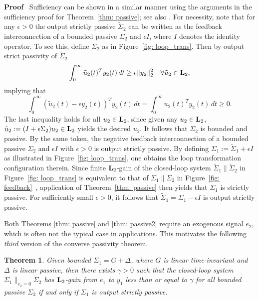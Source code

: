 \documentclass[11pt]{article}
\newtheorem{thm}[lemma]{Theorem}
\newcommand{\Ltwo}{\boldsymbol{\rm L}_{2}}
\begin{document}
\noindent
{\bf Proof} \,
  Sufficiency can be shown in a similar manner using the arguments in the sufficiency proof for Theorem~\ref{thm:
    passive}; see also \cite{Sch17}. For necessity, note that for any $\epsilon > 0$ the output strictly passive $\widetilde{\Sigma}_2$ can be written as the feedback interconnection of a bounded passive $\Sigma_2$ and $\epsilon I$, where $I$ denotes the identity operator. To see this, define $\Sigma_2$ as in Figure~\ref{fig: loop_trans}. Then by output strict passivity of $\widetilde{\Sigma}_2$
\[
\int_0^\infty \tilde{u}_2(t)^T y_2(t) \, dt \geq \epsilon \|y_2\|_2^2 \quad \forall \tilde{u}_2 \in \Ltwo,
\]
implying that
\[
\int_0^\infty (\tilde{u}_2(t) - \epsilon y_2(t))^T y_2(t) \, dt = \int_0^\infty u_2(t)^T y_2(t) \, dt \geq 0.
\]
The last inequality holds for all $u_2 \in \Ltwo$, since given any $u_2 \in \Ltwo$, $\tilde{u}_2 := (I + \epsilon \Sigma_2)u_2 \in \Ltwo$ yields the
desired $u_2$. It follows that $\Sigma_2$ is bounded and passive. By the same token, the negative feedback interconnection of a bounded passive
$\Sigma_2$ and $\epsilon I$ with $\epsilon > 0$ is output strictly passive. 
By defining $\Sigma_1 := \widetilde{\Sigma}_1 + \epsilon I$ as illustrated in Figure~\ref{fig: loop_trans}, one obtains the loop transformation
configuration therein. Since finite $\Ltwo$-gain of the closed-loop system $\widetilde{\Sigma}_1 \| \widetilde{\Sigma}_2$ in
Figure~\ref{fig: loop_trans} is equivalent to that of $\Sigma_1 \| \Sigma_2$ in Figure~\ref{fig: feedback}~\cite[Section 3.5]{GreLim95}, application
of Theorem~\ref{thm: passive} then yields that $\Sigma_1$ is strictly passive. For sufficiently small $\epsilon > 0$, it follows that
$\widetilde{\Sigma}_1 = \Sigma_1 - \epsilon I$ is output strictly passive. 

\medskip

Both Theorems \ref{thm: passive} and \ref{thm: passive2} require an exogenous signal $e_2$, which is often not the typical case in applications. This
motivates the following {\it third} version of the converse passivity theorem.

\begin{thm}\label{Theorem6}
  Given bounded $\Sigma_1 = G + \Delta$, where $G$ is linear time-invariant and $\Delta$ is linear passive, then there exists $\gamma >0$ such that
  the closed-loop system $\Sigma_1 \|_{e_2=0} \Sigma_2$ has $\Ltwo$-gain from $e_1$ to $y_1$ less than or equal to $\gamma$ for {\it all} bounded
  passive $\Sigma_2$ if and only if $\Sigma_1$ is output strictly passive.
\end{thm}
\end{document}
